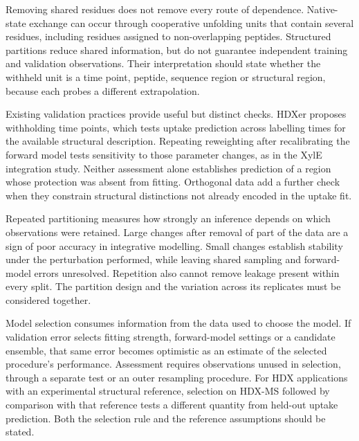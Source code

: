 Removing shared residues does not remove every route of dependence. Native-state exchange can occur through cooperative unfolding units that contain several residues, including residues assigned to non-overlapping peptides.\supercite{englanderHydrogenExchangeModern1997} Structured partitions reduce shared information, but do not guarantee independent training and validation observations. Their interpretation should state whether the withheld unit is a time point, peptide, sequence region or structural region, because each probes a different extrapolation.

Existing validation practices provide useful but distinct checks. HDXer proposes withholding time points, which tests uptake prediction across labelling times for the available structural description.\supercite{bradshawInterpretationHDXData2020} Repeating reweighting after recalibrating the forward model tests sensitivity to those parameter changes, as in the XylE integration study.\supercite{jiaIntegratingHydrogenDeuterium2023} Neither assessment alone establishes prediction of a region whose protection was absent from fitting. Orthogonal data add a further check when they constrain structural distinctions not already encoded in the uptake fit.

Repeated partitioning measures how strongly an inference depends on which observations were retained. Large changes after removal of part of the data are a sign of poor accuracy in integrative modelling.\supercite{bonomiPrinciplesProteinStructural2017} Small changes establish stability under the perturbation performed, while leaving shared sampling and forward-model errors unresolved. Repetition also cannot remove leakage present within every split. The partition design and the variation across its replicates must be considered together.

Model selection consumes information from the data used to choose the model. If validation error selects fitting strength, forward-model settings or a candidate ensemble, that same error becomes optimistic as an estimate of the selected procedure's performance.\supercite{cawleyOverfittingModelSelection2010} Assessment requires observations unused in selection, through a separate test or an outer resampling procedure. For HDX applications with an experimental structural reference, selection on HDX-MS followed by comparison with that reference tests a different quantity from held-out uptake prediction. Both the selection rule and the reference assumptions should be stated.

